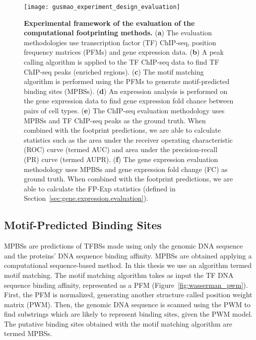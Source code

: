 \begin{figure}[h!]
\centering
\texttt{[image: gusmao\_experiment\_design\_evaluation]}
\caption[Experimental framework of the evaluation of the computational footprinting methods]{\textbf{Experimental framework of the evaluation of the computational footprinting methods.} (\textbf{a}) The evaluation methodologies use transcription factor (TF) ChIP-seq, position frequency matrices (PFMs) and gene expression data. (\textbf{b}) A peak calling algorithm is applied to the TF ChIP-seq data to find TF ChIP-seq peaks (enriched regions). (\textbf{c}) The motif matching algorithm is performed using the PFMs to generate motif-predicted binding sites (MPBSs). (\textbf{d}) An expression analysis is performed on the gene expression data to find gene expression fold chance between pairs of cell types. (\textbf{e}) The ChIP-seq evaluation methodology uses MPBSs and TF ChIP-seq peaks as the ground truth. When combined with the footprint predictions, we are able to calculate statistics such as the area under the receiver operating characteristic (ROC) curve (termed AUC) and area under the precision-recall (PR) curve (termed AUPR). (\textbf{f}) The gene expression evaluation methodology uses MPBSs and gene expression fold change (FC) as ground truth. When combined with the footprint predictions, we are able to calculate the FP-Exp statistics (defined in Section~\ref{sec:gene.expression.evaluation}).}
\label{fig:gusmao_experiment_design_evaluation}
\end{figure}

\subsection{Motif-Predicted Binding Sites}
\label{sec:motif.predicted.binding.sites}

MPBSs are predictions of TFBSs made using only the genomic DNA sequence and the proteins' DNA sequence binding affinity. MPBSs are obtained applying a computational sequence-based method. In this thesis we use an algorithm termed motif matching. The motif matching algorithm takes as input the TF DNA sequence binding affinity, represented as a PFM (Figure~\ref{fig:wasserman_pwm}). First, the PFM is normalized, generating another structure called position weight matrix (PWM). Then, the genomic DNA sequence is scanned using the PWM to find substrings which are likely to represent binding sites, given the PWM model. The putative binding sites obtained with the motif matching algorithm are termed MPBSs.

